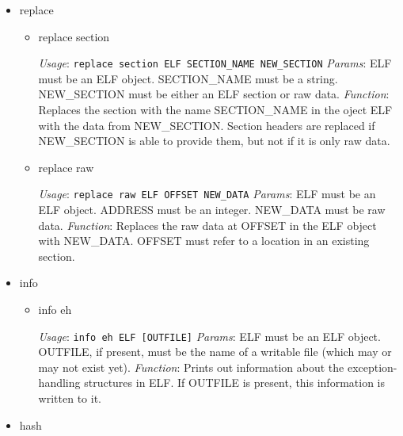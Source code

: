 \documentclass[11pt]{article}
\begin{document}
\begin{itemize}
\item replace\\
\label{sec-2.1.2.4}

\begin{itemize}

\item replace section\\
\label{sec-2.1.2.4.1}

      \emph{Usage}: \texttt{replace section ELF SECTION\_NAME NEW\_SECTION}
      \emph{Params}: ELF must be an ELF object. SECTION\_{}NAME must be a
                string. NEW\_{}SECTION must be either an ELF section or raw data.
      \emph{Function}: Replaces the section with the name SECTION\_{}NAME in
                  the oject ELF with the data from
                  NEW\_{}SECTION. Section headers are replaced if NEW\_{}SECTION is
                  able to provide them, but not if it is only raw data.
                   

\item replace raw\\
\label{sec-2.1.2.4.2}

      \emph{Usage}: \texttt{replace raw ELF OFFSET NEW\_DATA}
      \emph{Params}: ELF must be an ELF object. ADDRESS must be an
                integer. NEW\_{}DATA must be raw data.
      \emph{Function}: Replaces the raw data at OFFSET in the ELF object
                  with NEW\_{}DATA. OFFSET must refer to a location in an
                  existing section.
\end{itemize} %

\item info\\
\label{sec-2.1.2.5}

\begin{itemize}

\item info eh\\
\label{sec-2.1.2.5.1}

      \emph{Usage}: \texttt{info eh ELF [OUTFILE]}
      \emph{Params}: ELF must be an ELF object. OUTFILE, if present, must
                be the name of a writable file (which may or may not
                exist yet). 
      \emph{Function}: Prints out information about the exception-handling
                  structures in ELF. If OUTFILE is present, this
                  information is written to it.
\end{itemize} %

\item hash\\
\label{sec-2.1.2.6}


\end{itemize}
\end{document}
